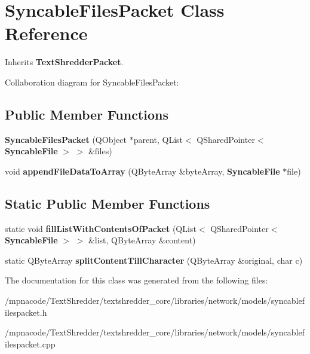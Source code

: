\section{SyncableFilesPacket Class Reference}
\label{class_syncable_files_packet}


Inherits {\bf TextShredderPacket}.



Collaboration diagram for SyncableFilesPacket:
\subsection*{Public Member Functions}
\begin{DoxyCompactItemize}
\item 
{\bfseries SyncableFilesPacket} (QObject $\ast$parent, QList$<$ QSharedPointer$<$ {\bf SyncableFile} $>$ $>$ \&files)\label{class_syncable_files_packet_a5ebeafe18bd390024bc8ee9015a4f19f}

\item 
void {\bfseries appendFileDataToArray} (QByteArray \&byteArray, {\bf SyncableFile} $\ast$file)\label{class_syncable_files_packet_a1c567d98b13db7aa2abe4604d5cd7589}

\end{DoxyCompactItemize}
\subsection*{Static Public Member Functions}
\begin{DoxyCompactItemize}
\item 
static void {\bfseries fillListWithContentsOfPacket} (QList$<$ QSharedPointer$<$ {\bf SyncableFile} $>$ $>$ \&list, QByteArray \&content)\label{class_syncable_files_packet_aaec97eef27ecea6af99b743f5e93ca4e}

\item 
static QByteArray {\bfseries splitContentTillCharacter} (QByteArray \&original, char c)\label{class_syncable_files_packet_a16c0067f62265ce5eecfb17e272cab79}

\end{DoxyCompactItemize}


The documentation for this class was generated from the following files:\begin{DoxyCompactItemize}
\item 
/mpnacode/TextShredder/textshredder\_\-core/libraries/network/models/syncablefilespacket.h\item 
/mpnacode/TextShredder/textshredder\_\-core/libraries/network/models/syncablefilespacket.cpp\end{DoxyCompactItemize}
